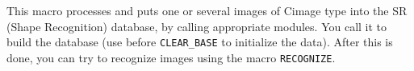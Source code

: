 This macro processes and puts one or several images of Cimage type
into the SR (Shape Recognition) database, by calling appropriate
modules. 
You call it to build the database (use before \verb+CLEAR_BASE+ to
initialize the data).
After this is done, you can try to recognize images using the
macro \verb+RECOGNIZE+.
